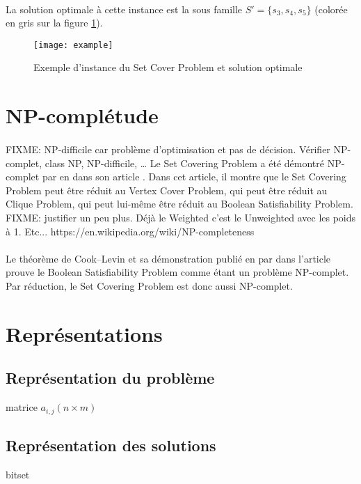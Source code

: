 \documentclass[12pt,letterpaper,twoside]{article}
\begin{document}
		\paragraph*{}
			La solution optimale à cette instance est la sous famille \(S'=\{s_3, s_4, s_5\}\) (colorée en gris sur la figure \ref{fig:example}).
		\begin{figure}[H]
			\centering%
			\texttt{[image: example]}%
			\caption{Exemple d'instance du Set Cover Problem et solution optimale\cite{Mount2017}}%
			\label{fig:example}%
		\end{figure}
	\section{NP-complétude}
		\paragraph*{}
			FIXME: NP-difficile car problème d'optimisation et pas de décision. Vérifier NP-complet, class NP, NP-difficile, …
			Le Set Covering Problem a été démontré NP-complet par \citeauthor{Karp1972} en \citeyear{Karp1972} dans son article \cite{Karp1972}. Dans cet article, il montre que le Set Covering Problem peut être réduit au Vertex Cover Problem, qui peut être réduit au Clique Problem, qui peut lui-même être réduit au Boolean Satisfiability Problem.
			FIXME: justifier un peu plus. Déjà le Weighted c'est le Unweighted avec les poids à 1. Etc...
			https://en.wikipedia.org/wiki/NP-completeness
		\paragraph*{}
			Le théorème de Cook–Levin et sa démonstration publié en \citeyear{Cook1971} par \citeauthor{Cook1971} dans l'article \cite{Cook1971} prouve le Boolean Satisfiability Problem comme étant un problème NP-complet. Par réduction, le Set Covering Problem est donc aussi NP-complet.

	\section{Représentations}
		\subsection*{Représentation du problème}
			matrice \(a_{i,j} (n \times m)\)
		\subsection{Représentation des solutions}
			bitset
\end{document}
